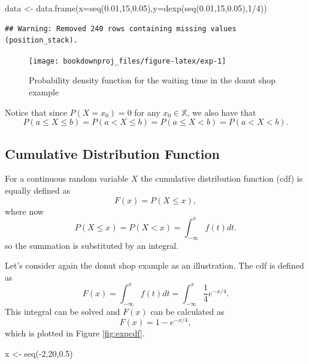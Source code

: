 \documentclass[
]{book}
\newenvironment{Shaded}{\begin{snugshade}}{\end{snugshade}}
\newcommand{\AttributeTok}[1]{\textcolor[rgb]{0.77,0.63,0.00}{#1}}
\newcommand{\DecValTok}[1]{\textcolor[rgb]{0.00,0.00,0.81}{#1}}
\newcommand{\FloatTok}[1]{\textcolor[rgb]{0.00,0.00,0.81}{#1}}
\newcommand{\FunctionTok}[1]{\textcolor[rgb]{0.00,0.00,0.00}{#1}}
\newcommand{\NormalTok}[1]{#1}
\newcommand{\OtherTok}[1]{\textcolor[rgb]{0.56,0.35,0.01}{#1}}
\newcommand{\SpecialCharTok}[1]{\textcolor[rgb]{0.00,0.00,0.00}{#1}}
\theoremstyle{definition}
\theoremstyle{definition}
\theoremstyle{definition}
\theoremstyle{definition}
\theoremstyle{remark}
\begin{document}
\begin{Shaded}
\begin{Highlighting}[]
\NormalTok{data }\OtherTok{\textless{}{-}} \FunctionTok{data.frame}\NormalTok{(}\AttributeTok{x=}\FunctionTok{seq}\NormalTok{(}\FloatTok{0.01}\NormalTok{,}\DecValTok{15}\NormalTok{,}\FloatTok{0.05}\NormalTok{),}\AttributeTok{y=}\FunctionTok{dexp}\NormalTok{(}\FunctionTok{seq}\NormalTok{(}\FloatTok{0.01}\NormalTok{,}\DecValTok{15}\NormalTok{,}\FloatTok{0.05}\NormalTok{),}\DecValTok{1}\SpecialCharTok{/}\DecValTok{4}\NormalTok{))}
\end{Highlighting}
\end{Shaded}

\begin{verbatim}
## Warning: Removed 240 rows containing missing values (position_stack).
\end{verbatim}

\begin{figure}

{\centering \texttt{[image: bookdownproj\_files/figure-latex/exp-1]} 

}

\caption{Probability density function for the waiting time in the donut shop example}\label{fig:exp}
\end{figure}

Notice that since \(P(X=x_0)=0\) for any \(x_0\in\mathbb{X}\), we also have that
\[
P(a\leq X \leq b)=P(a < X \leq b) = P(a\leq X < b) = P(a<X<b).
\]

\hypertarget{cumulative-distribution-function-1}{%
\subsection{Cumulative Distribution Function}\label{cumulative-distribution-function-1}}

For a continuous random variable \(X\) the cumulative distribution function (cdf) is equally defined as
\[
F(x) = P(X \leq x),
\]
where now
\[
P(X \leq x) = P(X < x) = \int_{-\infty}^xf(t)dt.
\]
so the summation is substituted by an integral.

Let's consider again the donut shop example as an illustration. The cdf is defined as
\[
F(x)=\int_{-\infty}^xf(t)dt = \int_{-\infty}^x\frac{1}{4}e^{-x/4}.
\]
This integral can be solved and \(F(x)\) can be calculated as
\[
F(x)= 1- e^{-x/4},
\]
which is plotted in Figure \ref{fig:expcdf}.

\begin{Shaded}
\begin{Highlighting}[]
\NormalTok{x }\OtherTok{\textless{}{-}} \FunctionTok{seq}\NormalTok{(}\SpecialCharTok{{-}}\DecValTok{2}\NormalTok{,}\DecValTok{20}\NormalTok{,}\FloatTok{0.5}\NormalTok{)}
\end{Highlighting}
\end{Shaded}
\end{document}
